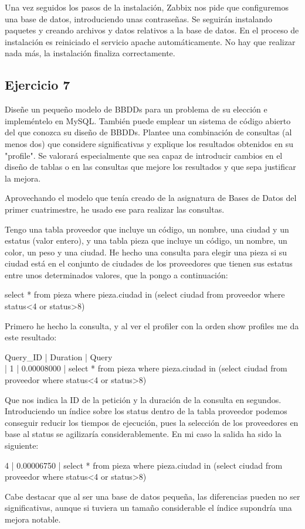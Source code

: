 \documentclass[a4paper, 11pt]{article} %
\begin{document}
Una vez seguidos los pasos de la instalación, Zabbix nos pide que configuremos una base de datos, introduciendo unas contraseñas. Se seguirán instalando paquetes y creando archivos y datos relativos a la base de datos. En el proceso de instalación es reiniciado el servicio apache automáticamente. No hay que realizar nada más, la instalación finaliza correctamente. 


\subsection{Ejercicio 7}
Diseñe un pequeño modelo de BBDDs para un problema de su elección e impleméntelo en MySQL. También puede emplear un sistema de código abierto del que conozca su diseño de BBDDs. Plantee una combinación de consultas (al menos dos) que considere significativas y explique los resultados obtenidos en su "profile". Se valorará especialmente que sea capaz de introducir cambios en el diseño de tablas o en las consultas que mejore los resultados y que sepa justificar la mejora. 

Aprovechando el modelo que tenía creado de la asignatura de Bases de Datos del primer cuatrimestre, he usado ese para realizar las consultas. 

Tengo una tabla proveedor que incluye un código, un nombre, una ciudad y un estatus (valor entero), y una tabla pieza que incluye un código, un nombre, un color, un peso y una ciudad. He hecho una consulta para elegir una pieza si su ciudad está en el conjunto de ciudades de los proveedores que tienen sus estatus entre unos determinados valores, que la pongo a continuación: 

select * from pieza where pieza.ciudad in (select ciudad from proveedor where status<4 or status>8)

Primero he hecho la consulta, y al ver el profiler con la orden show profiles me da este resultado: 

 Query\_ID | Duration   | Query \\
 |        1 | 0.00008000 | select * from pieza where pieza.ciudad in (select ciudad from proveedor where status<4 or status>8) 
 
Que nos indica la ID de la petición y la duración de la consulta en segundos. Introduciendo un índice sobre los status dentro de la tabla proveedor podemos conseguir reducir los tiempos de ejecución, pues la selección de los proveedores en base al status se agilizaría considerablemente. En mi caso la salida ha sido la siguiente: 

 4 | 0.00006750 | select * from pieza where pieza.ciudad in (select ciudad from proveedor where status<4 or status>8) 

Cabe destacar que al ser una base de datos pequeña, las diferencias pueden no ser significativas, aunque si tuviera un tamaño considerable el índice supondría una mejora notable. 
\end{document}
